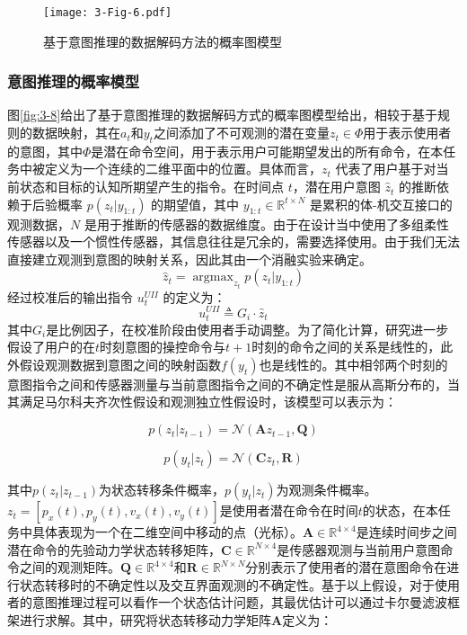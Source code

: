 \begin{figure}[htb]
    \centering
    \texttt{[image: 3-Fig-6.pdf]}
    \caption{基于意图推理的数据解码方法的概率图模型}
    \label{fig:3-6}
\end{figure} 

\subsubsection{意图推理的概率模型}
图\ref{fig:3-8}给出了基于意图推理的数据解码方式的概率图模型给出，相较于基于规则的数据映射，其在${a_t}$和${y_t}$之间添加了不可观测的潜在变量${z_t} \in \Phi $用于表示使用者的意图，其中$\Phi$是潜在命令空间，用于表示用户可能期望发出的所有命令，在本任务中被定义为一个连续的二维平面中的位置。具体而言，${z_t}$ 代表了用户基于对当前状态和目标的认知所期望产生的指令。在时间点 $t$，潜在用户意图 ${\hat z_t}$ 的推断依赖于后验概率 $p({z_t}|{y_{1:t}})$ 的期望值，其中 $y_{1:t} \in {\mathbb{R}^{t \times N}}$ 是累积的体-机交互接口的观测数据，$N$ 是用于推断的传感器的数据维度。由于在设计当中使用了多组柔性传感器以及一个惯性传感器，其信息往往是冗余的，需要选择使用。由于我们无法直接建立观测到意图的映射关系，因此其由一个消融实验来确定。
\begin{equation}
    \label{eq5}
    \hat z_t = \mathop{argmax}_{z_t} p({z_t}|{y_{1:t}})
\end{equation}
经过校准后的输出指令 $u_t^{UII}$ 的定义为：
\begin{equation}
\label{eq6}
u_t^{UII} \triangleq {G_i} \cdot {\hat z_t}
\end{equation}    
其中$G_i$是比例因子，在校准阶段由使用者手动调整。为了简化计算，研究进一步假设了用户的在$t$时刻意图的操控命令与$t+1$时刻的命令之间的关系是线性的，此外假设观测数据到意图之间的映射函数$f(y_t)$也是线性的。其中相邻两个时刻的意图指令之间和传感器测量与当前意图指令之间的不确定性是服从高斯分布的，当其满足马尔科夫齐次性假设和观测独立性假设时，该模型可以表示为：

\begin{equation}
\label{eq7}
p({z_t}|{z_{t - 1}}) = \mathcal{N}({\mathbf{A}}{z_{t - 1}},{{\mathbf{Q}}})
\end{equation}   

\begin{equation}
\label{eq8}
p({y_t}|{z_t}) = \mathcal{N}({\mathbf{C}}{z_t},{{\mathbf{R}}})
\end{equation}    

其中$p({z_t}|{z_{t - 1}})$为状态转移条件概率，$p({y_t}|{z_t})$为观测条件概率。${z_t} = [{p_x}(t),{p_y}(t),{v_x}(t),{v_y}(t)]$是使用者潜在命令在时间$t$的状态，在本任务中具体表现为一个在二维空间中移动的点（光标）。${\mathbf{A}} \in {\mathbb{R}^{4 \times 4}}$是连续时间步之间潜在命令的先验动力学状态转移矩阵，${\mathbf{C}} \in {\mathbb{R}^{N \times 4}}$是传感器观测与当前用户意图命令之间的观测矩阵。${{\mathbf{Q}}} \in {\mathbb{R}^{4 \times 4}}$和${{\mathbf{R}}} \in {\mathbb{R}^{N \times N}}$分别表示了使用者的潜在意图命令在进行状态转移时的不确定性以及交互界面观测的不确定性。基于以上假设，对于使用者的意图推理过程可以看作一个状态估计问题，其最优估计可以通过卡尔曼滤波框架进行求解。其中，研究将状态转移动力学矩阵${\mathbf{A}}$定义为：

